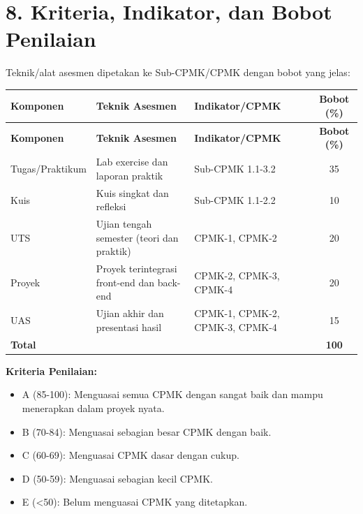 \documentclass[12pt,a4paper]{article}
\begin{document}
\vspace{0.5cm}

\section*{8. Kriteria, Indikator, dan Bobot Penilaian}

Teknik/alat asesmen dipetakan ke Sub-CPMK/CPMK dengan bobot yang jelas:

\begin{longtable}{|>{\raggedright\arraybackslash}p{2.8cm}|>{\raggedright\arraybackslash}p{4cm}|>{\raggedright\arraybackslash}p{5.7cm}|c|}
\hline
\textbf{Komponen} & \textbf{Teknik Asesmen} & \textbf{Indikator/CPMK} & \textbf{Bobot (\%)} \\
\hline
\endfirsthead
\hline
\textbf{Komponen} & \textbf{Teknik Asesmen} & \textbf{Indikator/CPMK} & \textbf{Bobot (\%)} \\
\hline
\endhead
\hline
\endfoot

Tugas/Praktikum & Lab exercise dan laporan praktik & Sub-CPMK 1.1-3.2 & 35 \\
\hline
Kuis & Kuis singkat dan refleksi & Sub-CPMK 1.1-2.2 & 10 \\
\hline
UTS & Ujian tengah semester (teori dan praktik) & CPMK-1, CPMK-2 & 20 \\
\hline
Proyek & Proyek terintegrasi front-end dan back-end & CPMK-2, CPMK-3, CPMK-4 & 20 \\
\hline
UAS & Ujian akhir dan presentasi hasil & CPMK-1, CPMK-2, CPMK-3, CPMK-4 & 15 \\
\hline
\textbf{Total} & & & \textbf{100} \\
\hline
\end{longtable}

\textbf{Kriteria Penilaian:}
\begin{itemize}[leftmargin=*]
  \item A (85-100): Menguasai semua CPMK dengan sangat baik dan mampu menerapkan dalam proyek nyata.
  \item B (70-84): Menguasai sebagian besar CPMK dengan baik.
  \item C (60-69): Menguasai CPMK dasar dengan cukup.
  \item D (50-59): Menguasai sebagian kecil CPMK.
  \item E (<50): Belum menguasai CPMK yang ditetapkan.
\end{itemize}
\end{document}
